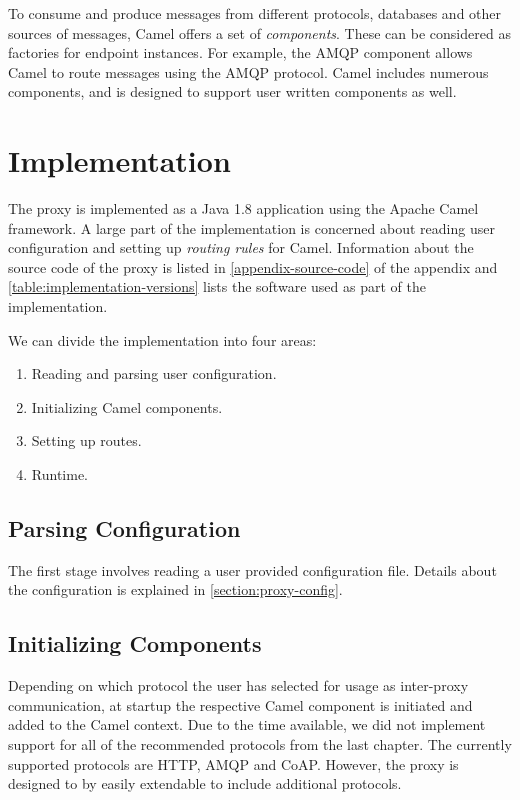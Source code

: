 To consume and produce messages from different protocols, databases and other
sources of messages, Camel offers a set of \textit{components}. These
can be considered as factories for endpoint instances. For example, the AMQP
component allows Camel to route messages using the AMQP protocol. Camel includes
numerous components, and is designed to support user written components as well.


\section{Implementation}

The proxy is implemented as a Java 1.8 application using the Apache Camel
framework. A large part of the implementation is concerned about reading user
configuration and setting up \textit{routing rules} for Camel. Information about
the source code of the proxy is listed in \cref{appendix-source-code} of the
appendix and \cref{table:implementation-versions} lists the software used as
part of the implementation.

We can divide the implementation into four areas:

\begin{enumerate}
    \item Reading and parsing user configuration.
    \item Initializing Camel components.
    \item Setting up routes.
    \item Runtime.
\end{enumerate}

\subsection{Parsing Configuration}

The first stage involves reading a user provided configuration file. Details
about the configuration is explained in \cref{section:proxy-config}.

\subsection{Initializing Components}

Depending on which protocol the user has selected for usage as inter-proxy
communication, at startup the respective Camel component is initiated and added
to the Camel context. Due to the time available, we did not implement support for all of the
recommended protocols from the last chapter. The currently supported protocols
are HTTP, AMQP and CoAP. However, the proxy is designed to by easily extendable to
include additional protocols.

